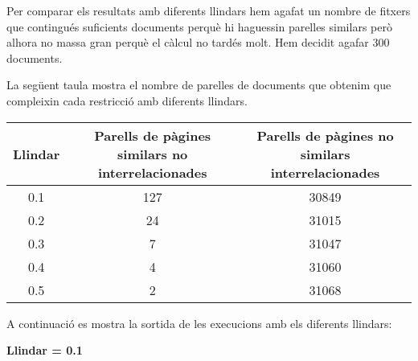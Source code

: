 \documentclass{report}
\begin{document}
Per comparar els resultats amb diferents llindars hem agafat un nombre de fitxers que contingués suficients documents perquè hi haguessin parelles similars però alhora no massa gran perquè el càlcul no tardés molt. Hem decidit agafar 300 documents.

La següent taula mostra el nombre de parelles de documents que obtenim que compleixin cada restricció amb diferents llindars.


\begin{center}
    \begin{tabular}{| c | c | c |}
    \hline
    Llindar & Parells de pàgines similars no interrelacionades & Parells de pàgines no similars interrelacionades \\ \hline
    0.1 & 127 & 30849 \\ \hline
    0.2 & 24  & 31015 \\ \hline
    0.3 & 7   & 31047 \\ \hline
    0.4 & 4   & 31060 \\ \hline
    0.5 & 2   & 31068 \\
    \hline
    \end{tabular}
\end{center}

A continuació es mostra la sortida de les execucions amb els diferents llindars:
\newline
\newline
\centerline{ \textbf{Llindar = 0.1} }
\end{document}
